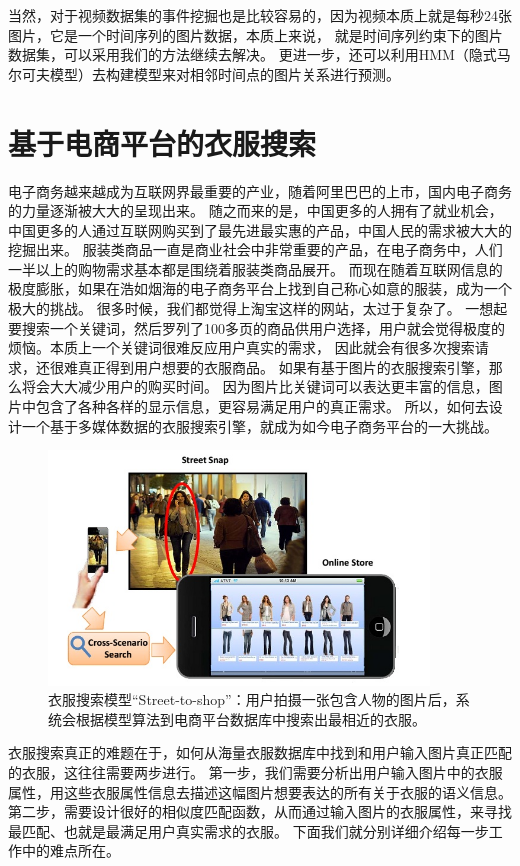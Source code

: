 当然，对于视频数据集的事件挖掘也是比较容易的，因为视频本质上就是每秒24张图片，它是一个时间序列的图片数据，本质上来说，
就是时间序列约束下的图片数据集，可以采用我们的方法继续去解决。
更进一步，还可以利用HMM（隐式马尔可夫模型）去构建模型来对相邻时间点的图片关系进行预测。


\section{基于电商平台的衣服搜索}
电子商务越来越成为互联网界最重要的产业，随着阿里巴巴的上市，国内电子商务的力量逐渐被大大的呈现出来。
随之而来的是，中国更多的人拥有了就业机会，中国更多的人通过互联网购买到了最先进最实惠的产品，中国人民的需求被大大的挖掘出来。
服装类商品一直是商业社会中非常重要的产品，在电子商务中，人们一半以上的购物需求基本都是围绕着服装类商品展开。
而现在随着互联网信息的极度膨胀，如果在浩如烟海的电子商务平台上找到自己称心如意的服装，成为一个极大的挑战。
很多时候，我们都觉得上淘宝这样的网站，太过于复杂了。
一想起要搜索一个关键词，然后罗列了100多页的商品供用户选择，用户就会觉得极度的烦恼。本质上一个关键词很难反应用户真实的需求，
因此就会有很多次搜索请求，还很难真正得到用户想要的衣服商品。
如果有基于图片的衣服搜索引擎，那么将会大大减少用户的购买时间。
因为图片比关键词可以表达更丰富的信息，图片中包含了各种各样的显示信息，更容易满足用户的真正需求。
所以，如何去设计一个基于多媒体数据的衣服搜索引擎，就成为如今电子商务平台的一大挑战。

\begin{figure}
\centering
\includegraphics[width=0.9\textwidth]{img/street2shop.jpg}
\caption{衣服搜索模型“Street-to-shop”：用户拍摄一张包含人物的图片后，系统会根据模型算法到电商平台数据库中搜索出最相近的衣服。}
\label{fig:street}
\end{figure}

衣服搜索真正的难题在于，如何从海量衣服数据库中找到和用户输入图片真正匹配的衣服，这往往需要两步进行。
第一步，我们需要分析出用户输入图片中的衣服属性，用这些衣服属性信息去描述这幅图片想要表达的所有关于衣服的语义信息。
第二步，需要设计很好的相似度匹配函数，从而通过输入图片的衣服属性，来寻找最匹配、也就是最满足用户真实需求的衣服。
下面我们就分别详细介绍每一步工作中的难点所在。

